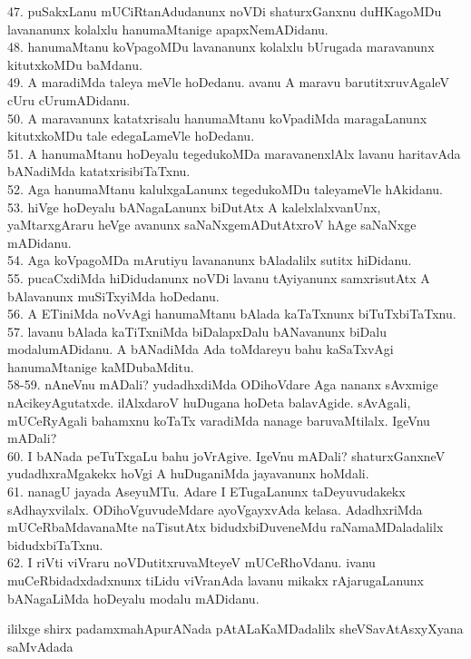 \documentclass{article}
\begin{document}
47. puSakxLanu mUCiRtanAdudanunx noVDi shaturxGanxnu duHKagoMDu lavananunx kolalxlu hanumaMtanige apapxNemADidanu.\\
48. hanumaMtanu koVpagoMDu lavananunx kolalxlu bUrugada maravanunx kitutxkoMDu baMdanu.\\
49. A maradiMda taleya meVle hoDedanu. avanu A maravu barutitxruvAgaleV cUru cUrumADidanu.\\
50. A maravanunx katatxrisalu hanumaMtanu koVpadiMda maragaLanunx kitutxkoMDu tale edegaLameVle hoDedanu.\\
51. A hanumaMtanu hoDeyalu tegedukoMDa maravanenxlAlx lavanu haritavAda bANadiMda katatxrisibiTaTxnu.\\
52. Aga hanumaMtanu kalulxgaLanunx tegedukoMDu taleyameVle hAkidanu.\\
53. hiVge hoDeyalu bANagaLanunx biDutAtx A kalelxlalxvanUnx, yaMtarxgAraru heVge avanunx saNaNxgemADutAtxroV hAge saNaNxge mADidanu.\\
54. Aga koVpagoMDa mArutiyu lavananunx bAladalilx sutitx hiDidanu.\\
55. pucaCxdiMda hiDidudanunx noVDi lavanu tAyiyanunx samxrisutAtx A bAlavanunx muSiTxyiMda hoDedanu.\\
56. A ETiniMda noVvAgi hanumaMtanu bAlada kaTaTxnunx biTuTxbiTaTxnu.\\
57. lavanu bAlada kaTiTxniMda biDalapxDalu bANavanunx biDalu modalumADidanu. A bANadiMda Ada toMdareyu bahu kaSaTxvAgi hanumaMtanige kaMDubaMditu.\\
58-59. nAneVnu mADali? yudadhxdiMda ODihoVdare Aga nananx sAvxmige nAcikeyAgutatxde. ilAlxdaroV huDugana hoDeta balavAgide. sAvAgali, mUCeRyAgali bahamxnu koTaTx varadiMda nanage baruvaMtilalx. IgeVnu mADali?\\
60. I bANada peTuTxgaLu bahu joVrAgive. IgeVnu mADali? shaturxGanxneV yudadhxraMgakekx hoVgi A huDuganiMda jayavanunx hoMdali.\\
61. nanagU jayada AseyuMTu. Adare I ETugaLanunx taDeyuvudakekx sAdhayxvilalx. ODihoVguvudeMdare ayoVgayxvAda kelasa. AdadhxriMda mUCeRbaMdavanaMte naTisutAtx bidudxbiDuveneMdu raNamaMDaladalilx bidudxbiTaTxnu.\\
62. I riVti viVraru noVDutitxruvaMteyeV mUCeRhoVdanu. ivanu muCeRbidadxdadxnunx tiLidu viVranAda lavanu mikakx rAjarugaLanunx bANagaLiMda hoDeyalu modalu mADidanu.\\

\begin{center}
ililxge shirx padamxmahApurANada pAtALaKaMDadalilx sheVSavAtAsxyXyana saMvAdada
\end{center}
\end{document}
